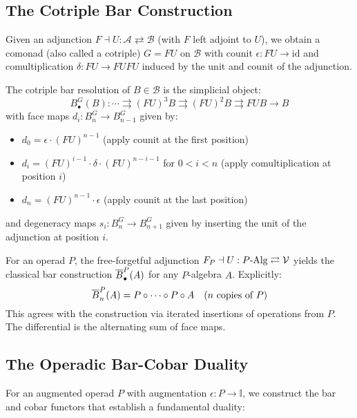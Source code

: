 \subsection{The Cotriple Bar Construction}
 
Given an adjunction $F \dashv U : \mathcal{A} \rightleftarrows \mathcal{B}$ (with $F$ left adjoint to $U$), we obtain a comonad (also called a cotriple) $G = FU$ on $\mathcal{B}$ with counit $\epsilon : FU \to \text{id}$ and comultiplication $\delta : FU \to FUFU$ induced by the unit and counit of the adjunction.
 
\begin{definition}
The cotriple bar resolution of $B \in \mathcal{B}$ is the simplicial object:
\[
B^G_\bullet(B) : \cdots \rightrightarrows (FU)^3B \rightrightarrows (FU)^2B \rightrightarrows FUB \to B
\]
with face maps $d_i : B^G_n \to B^G_{n-1}$ given by:
\begin{itemize}
\item $d_0 = \epsilon \cdot (FU)^{n-1}$ (apply counit at the first position)
\item $d_i = (FU)^{i-1} \cdot \delta \cdot (FU)^{n-i-1}$ for $0 < i < n$ (apply comultiplication at position $i$)  
\item $d_n = (FU)^{n-1} \cdot \epsilon$ (apply counit at the last position)
\end{itemize}
and degeneracy maps $s_i : B^G_n \to B^G_{n+1}$ given by inserting the unit of the adjunction at position $i$.
\end{definition}
 
\begin{example}
For an operad $P$, the free-forgetful adjunction $F_P \dashv U : P\text{-Alg} \rightleftarrows \mathcal{V}$ yields the classical bar construction $\overline{B}^P_\bullet(A)$ for any $P$-algebra $A$. Explicitly:
\[
\overline{B}^P_n(A) = P \circ \cdots \circ P \circ A \quad \text{($n$ copies of $P$)}
\]
This agrees with the construction via iterated insertions of operations from $P$. The differential is the alternating sum of face maps.
\end{example}
 
\subsection{The Operadic Bar-Cobar Duality}
 
For an augmented operad $P$ with augmentation $\epsilon : P \to \mathbb{I}$, we construct the bar and cobar functors that establish a fundamental duality:
 
